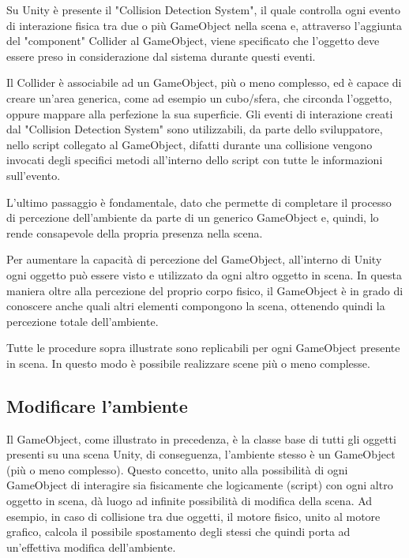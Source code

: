 \medskip

Su Unity è presente il "Collision Detection System", il quale controlla ogni evento di interazione fisica tra due o più GameObject nella scena e, attraverso l'aggiunta del "component" Collider al GameObject, viene specificato che l'oggetto deve essere preso in considerazione dal sistema durante questi eventi.

\medskip

Il Collider è associabile ad un GameObject, più o meno complesso, ed è capace di creare un'area generica, come ad esempio un cubo/sfera, che circonda l'oggetto, oppure mappare alla perfezione la sua superficie. Gli eventi di interazione creati dal "Collision Detection System" sono utilizzabili, da parte dello sviluppatore, nello script collegato al GameObject, difatti durante una collisione vengono invocati degli specifici metodi all'interno dello script con tutte le informazioni sull'evento. \cite{unity_collision}

L'ultimo passaggio è fondamentale, dato che permette di completare il processo di percezione dell'ambiente da parte di un generico GameObject e, quindi, lo rende consapevole della propria presenza nella scena.

\medskip

Per aumentare la capacità di percezione del GameObject, all'interno di Unity ogni oggetto può essere visto e utilizzato da ogni altro oggetto in scena. In questa maniera oltre alla percezione del proprio corpo fisico, il GameObject è in grado di conoscere anche quali altri elementi compongono la scena, ottenendo quindi la percezione totale dell'ambiente.

\medskip

Tutte le procedure sopra illustrate sono replicabili per ogni GameObject presente in scena. In questo modo è possibile realizzare scene più o meno complesse.

\subsection{Modificare l'ambiente}

Il GameObject, come illustrato in precedenza, è la classe base di tutti gli oggetti presenti su una scena Unity, di conseguenza, l'ambiente stesso è un GameObject (più o meno complesso). Questo concetto, unito alla possibilità di ogni GameObject di interagire sia fisicamente che logicamente (script) con ogni altro oggetto in scena, dà luogo ad infinite possibilità di modifica della scena. Ad esempio, in caso di collisione tra due oggetti, il motore fisico, unito al motore grafico, calcola il possibile spostamento degli stessi che quindi porta ad un'effettiva modifica dell'ambiente.


